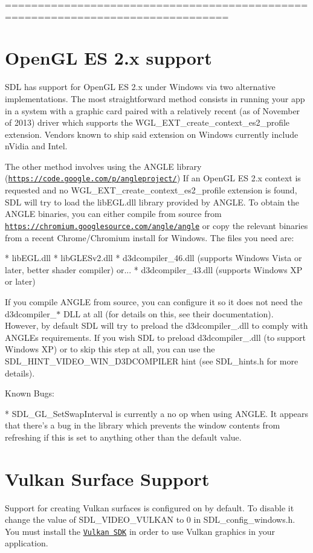 ================================================================================ \section*{Open\+GL ES 2.\+x support }

S\+DL has support for Open\+GL ES 2.\+x under Windows via two alternative implementations. The most straightforward method consists in running your app in a system with a graphic card paired with a relatively recent (as of November of 2013) driver which supports the W\+G\+L\+\_\+\+E\+X\+T\+\_\+create\+\_\+context\+\_\+es2\+\_\+profile extension. Vendors known to ship said extension on Windows currently include n\+Vidia and Intel.

The other method involves using the A\+N\+G\+LE library (\href{https://code.google.com/p/angleproject/}{\tt https\+://code.\+google.\+com/p/angleproject/}) If an Open\+GL ES 2.\+x context is requested and no W\+G\+L\+\_\+\+E\+X\+T\+\_\+create\+\_\+context\+\_\+es2\+\_\+profile extension is found, S\+DL will try to load the lib\+E\+G\+L.\+dll library provided by A\+N\+G\+LE. To obtain the A\+N\+G\+LE binaries, you can either compile from source from \href{https://chromium.googlesource.com/angle/angle}{\tt https\+://chromium.\+googlesource.\+com/angle/angle} or copy the relevant binaries from a recent Chrome/\+Chromium install for Windows. The files you need are\+: \begin{DoxyVerb}* libEGL.dll
* libGLESv2.dll
* d3dcompiler_46.dll (supports Windows Vista or later, better shader compiler)
or...
* d3dcompiler_43.dll (supports Windows XP or later)
\end{DoxyVerb}


If you compile A\+N\+G\+LE from source, you can configure it so it does not need the d3dcompiler\+\_\+$\ast$ D\+LL at all (for details on this, see their documentation). However, by default S\+DL will try to preload the d3dcompiler\+\_.\+dll to comply with A\+N\+G\+LE\textquotesingle{}s requirements. If you wish S\+DL to preload d3dcompiler\+\_.\+dll (to support Windows XP) or to skip this step at all, you can use the S\+D\+L\+\_\+\+H\+I\+N\+T\+\_\+\+V\+I\+D\+E\+O\+\_\+\+W\+I\+N\+\_\+\+D3\+D\+C\+O\+M\+P\+I\+L\+ER hint (see S\+D\+L\+\_\+hints.\+h for more details).

Known Bugs\+: \begin{DoxyVerb}* SDL_GL_SetSwapInterval is currently a no op when using ANGLE. It appears
  that there's a bug in the library which prevents the window contents from
  refreshing if this is set to anything other than the default value.
\end{DoxyVerb}


\section*{Vulkan Surface Support }

Support for creating Vulkan surfaces is configured on by default. To disable it change the value of {\ttfamily S\+D\+L\+\_\+\+V\+I\+D\+E\+O\+\_\+\+V\+U\+L\+K\+AN} to 0 in {\ttfamily S\+D\+L\+\_\+config\+\_\+windows.\+h}. You must install the \href{https://www.lunarg.com/vulkan-sdk/}{\tt Vulkan S\+DK} in order to use Vulkan graphics in your application. 